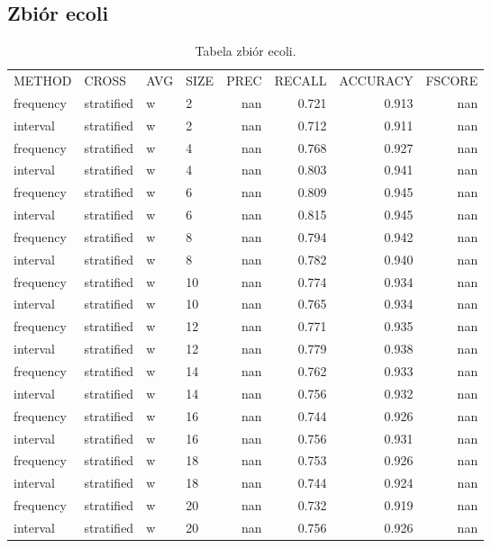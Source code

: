 \subsection{Zbiór ecoli}
\begin{table}[H]
\centering
\caption{Tabela zbiór ecoli.}
\label{table-ecoli}
\begin{tabular}{llllrrrr}
METHOD    & CROSS      & AVG & SIZE & PREC & RECALL & ACCURACY & FSCORE \\
frequency & stratified & w   & 2    & nan  & 0.721  & 0.913    & nan    \\
interval  & stratified & w   & 2    & nan  & 0.712  & 0.911    & nan    \\
frequency & stratified & w   & 4    & nan  & 0.768  & 0.927    & nan    \\
interval  & stratified & w   & 4    & nan  & 0.803  & 0.941    & nan    \\
frequency & stratified & w   & 6    & nan  & 0.809  & 0.945    & nan    \\
interval  & stratified & w   & 6    & nan  & 0.815  & 0.945    & nan    \\
frequency & stratified & w   & 8    & nan  & 0.794  & 0.942    & nan    \\
interval  & stratified & w   & 8    & nan  & 0.782  & 0.940    & nan    \\
frequency & stratified & w   & 10   & nan  & 0.774  & 0.934    & nan    \\
interval  & stratified & w   & 10   & nan  & 0.765  & 0.934    & nan    \\
frequency & stratified & w   & 12   & nan  & 0.771  & 0.935    & nan    \\
interval  & stratified & w   & 12   & nan  & 0.779  & 0.938    & nan    \\
frequency & stratified & w   & 14   & nan  & 0.762  & 0.933    & nan    \\
interval  & stratified & w   & 14   & nan  & 0.756  & 0.932    & nan    \\
frequency & stratified & w   & 16   & nan  & 0.744  & 0.926    & nan    \\
interval  & stratified & w   & 16   & nan  & 0.756  & 0.931    & nan    \\
frequency & stratified & w   & 18   & nan  & 0.753  & 0.926    & nan    \\
interval  & stratified & w   & 18   & nan  & 0.744  & 0.924    & nan    \\
frequency & stratified & w   & 20   & nan  & 0.732  & 0.919    & nan    \\
interval  & stratified & w   & 20   & nan  & 0.756  & 0.926    & nan   
\end{tabular}
\end{table}

